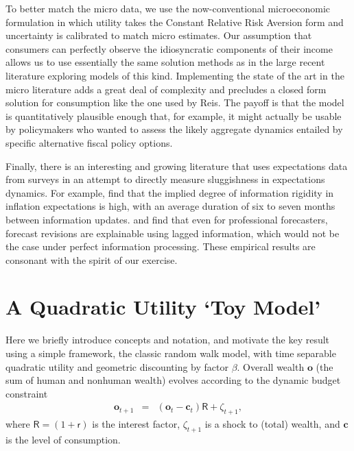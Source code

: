 \documentclass[titlepage]{./econtex}
\begin{document}
To better match the micro data, we use the now-conventional microeconomic formulation in which utility takes the Constant Relative Risk Aversion form and uncertainty is calibrated to match micro estimates.  Our assumption that consumers can perfectly observe the idiosyncratic components of their income allows us to use essentially the same solution methods as in the large recent literature exploring models of this kind.
Implementing the state of the art in the micro literature adds a great deal of complexity and precludes a closed form solution for consumption like the one used by Reis. The payoff is that the model is quantitatively plausible enough that, for example, it might actually be usable by policymakers who wanted to assess the likely aggregate dynamics entailed by specific alternative fiscal policy options.

Finally, there is an interesting and growing literature that uses expectations data from surveys in an attempt to directly measure sluggishness in expectations dynamics.
For example, \cite{coibGor:AER15} find that the implied degree of information rigidity in inflation expectations is high, with an average duration of six to seven months between information updates. \cite{fuhrer:JME17} and \cite{fuhrerIntrinsicPersistence} find that even for professional forecasters, forecast revisions are explainable using lagged information, which would not be the case under perfect information processing.  These empirical results are consonant with the spirit of our exercise.

\section{A Quadratic Utility `Toy Model'}\label{sec:Quadratic}

Here we briefly introduce concepts and notation, and motivate the key result using a simple framework, the classic \cite{hallRandomWalk} random walk model, with time separable quadratic utility and geometric discounting by factor $\beta$.  Overall wealth $\mathbf{o}$ (the sum of human and nonhuman wealth) evolves according to the dynamic budget constraint
\begin{eqnarray}
  \mathbf{o}_{t+1} & = & (\mathbf{o}_{t}-\mathbf{c}_{t})\mathsf{R}+\zeta_{t+1}, \label{eq:zAccum}
\end{eqnarray}
 where $\mathsf{R}=(1+\mathsf{r})$ is the interest factor, $\zeta_{t+1}$ is a shock to (total) wealth, and $\mathbf{c}$ is the level of consumption.
\end{document}
